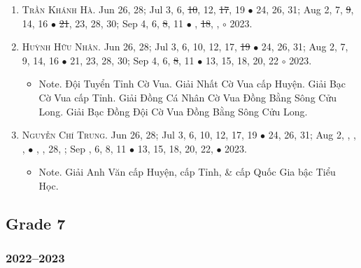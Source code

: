 \documentclass{article}
\begin{document}
\begin{enumerate}
	\item \textsc{Trần Khánh Hà.} {\sf[In]} Jun 26, 28; Jul 3, 6, \st{10}, 12, \st{17}, 19 $\bullet$ 24, 26, 31; Aug 2, 7, \st{9}, 14, 16 $\bullet$ \st{21}, 23, 28, 30; Sep 4, 6, \st{8}, 11 $\bullet$ , \st{18}, , $\circ$ 2023.
	\item \textsc{Huỳnh Hữu Nhân.} {\sf[In]} Jun 26, 28; Jul 3, 6, 10, 12, 17, \st{19} $\bullet$ 24, 26, 31; Aug 2, 7, 9, 14, 16 $\bullet$ 21, 23, 28, 30; Sep 4, 6, \st{8}, 11 $\bullet$ 13, 15, 18, 20, 22 $\circ$ 2023.
	\begin{itemize}
		\item {\sf Note.} Đội Tuyển Tỉnh Cờ Vua. Giải Nhất Cờ Vua cấp Huyện. Giải Bạc Cờ Vua cấp Tỉnh. Giải Đồng Cá Nhân Cờ Vua Đồng Bằng Sông Cửu Long. Giải Bạc Đồng Đội Cờ Vua Đồng Bằng Sông Cửu Long.
	\end{itemize}
	\item \textsc{Nguyễn Chí Trung.} {\sf[In]} Jun 26, 28; Jul 3, 6, 10, 12, 17, 19 $\bullet$ 24, 26, 31; Aug 2, , , ,  $\bullet$ , , 28, ; Sep , 6, 8, 11 $\bullet$ 13, 15, 18, 20, 22, $\bullet$ 2023.
	\begin{itemize}
		\item {\sf Note.} Giải Anh Văn cấp Huyện, cấp Tỉnh, \& cấp Quốc Gia bậc Tiểu Học.
	\end{itemize}
\end{enumerate}


\subsection{Grade 7}

\subsubsection{2022--2023}
\end{document}
